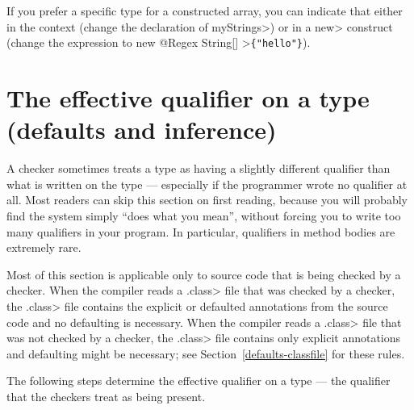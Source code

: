 If you prefer a specific type for a constructed array, you can indicate
that either in the context (change the declaration of \<myStrings>) or in a
\<new> construct (change the expression to \<new @Regex String[] >\verb|{"hello"}|).


\section{The effective qualifier on a type (defaults and inference)\label{effective-qualifier}}

A checker sometimes treats a type as having a slightly different qualifier
than what is written on the type --- especially if the programmer wrote no
qualifier at all.
Most readers can skip this section on first reading, because you will
probably find the system simply ``does what you mean'', without forcing
you to write too many qualifiers in your program.
In particular, qualifiers in method bodies are extremely rare.

Most of this section is applicable only to source code that is being
checked by a checker.
%
When the compiler reads a \<.class> file that was checked by a
checker, the \<.class> file contains the explicit or defaulted
annotations from the source code and no defaulting is necessary.
%
When the compiler reads a \<.class> file that was not checked by a
checker, the \<.class> file contains only explicit annotations and
defaulting might be necessary; see Section~\ref{defaults-classfile}
for these rules.

  The following steps determine the effective
qualifier on a type --- the qualifier that the checkers treat as being present.

